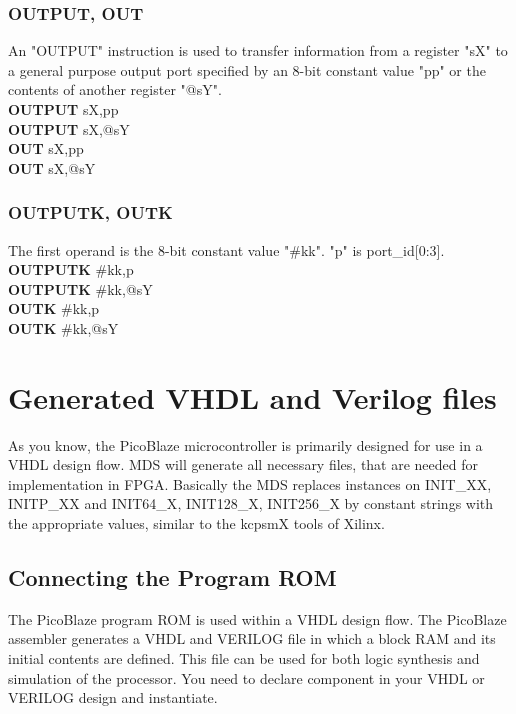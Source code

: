         \subsubsection{OUTPUT, OUT}
            An "OUTPUT" instruction is used to transfer information from a register "sX" to a general purpose output port specified by an 8-bit constant value "pp" or the
            contents of another register "@sY".\\
                \textbf{OUTPUT}     sX,pp\\
                \textbf{OUTPUT}     sX,@sY\\
                \textbf{OUT}        sX,pp\\
                \textbf{OUT}        sX,@sY\\
        \subsubsection{OUTPUTK, OUTK}
            The first operand is the 8-bit constant value "\#kk". "p" is port\_id[0:3].\\
                \textbf{OUTPUTK}     \#kk,p\\
                \textbf{OUTPUTK}     \#kk,@sY\\
                \textbf{OUTK}        \#kk,p\\
                \textbf{OUTK}        \#kk,@sY\\

        \section{Generated VHDL and Verilog files}
            As you know, the PicoBlaze microcontroller is primarily designed for use in a VHDL design flow.
            MDS will generate all necessary files, that are needed for
            implementation in FPGA. Basically the MDS replaces instances on
            {INIT\_XX}, {INITP\_XX} and {INIT64\_X}, {INIT128\_X}, {INIT256\_X} by constant strings with the appropriate values, similar to the kcpsmX tools of Xilinx.

                \subsection{Connecting the Program ROM}
                    The PicoBlaze program ROM is used within a VHDL design flow. The PicoBlaze assembler
                    generates a VHDL and VERILOG file in which a block RAM and its initial contents are defined. This
                    file can be used for both logic synthesis and simulation of the processor.
                    You need to declare component in your VHDL or VERILOG design and instantiate.\\
